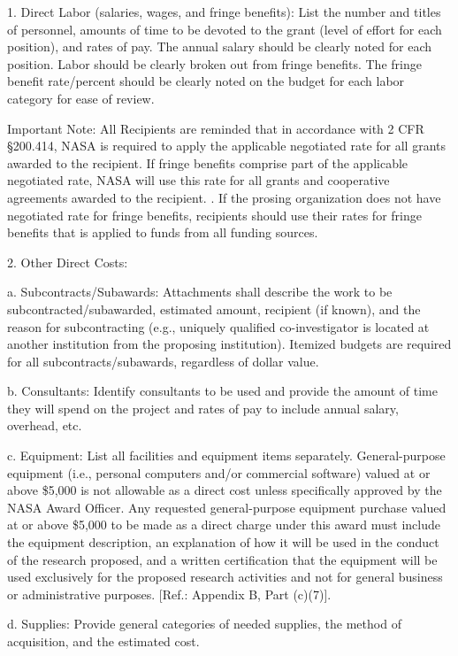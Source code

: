 \documentclass[12pt]{article}
\begin{document}
1. Direct Labor (salaries, wages, and fringe benefits): List the
   number and titles of personnel, amounts of time to be devoted to
   the grant (level of effort for each position), and rates of
   pay. The annual salary should be clearly noted for each
   position. Labor should be clearly broken out from fringe
   benefits. The fringe benefit rate/percent should be clearly noted
   on the budget for each labor category for ease of review.

Important Note: All Recipients are reminded that in accordance with 2
CFR \S 200.414, NASA is required to apply the applicable negotiated
rate for all grants awarded to the recipient. If fringe benefits
comprise part of the applicable negotiated rate, NASA will use this
rate for all grants and cooperative agreements awarded to the
recipient. . If the prosing organization does not have negotiated rate
for fringe benefits, recipients should use their rates for fringe
benefits that is applied to funds from all funding sources.



2. Other
Direct Costs:

a. Subcontracts/Subawards: Attachments shall describe the work to be
subcontracted/subawarded, estimated amount, recipient (if known), and
the reason for subcontracting (e.g., uniquely qualified
co-investigator is located at another institution from the proposing
institution). Itemized budgets are required for all
subcontracts/subawards, regardless of dollar value.

b. Consultants: Identify consultants to be used and provide the amount
of time they will spend on the project and rates of pay to include
annual salary, overhead, etc.

c. Equipment: List all facilities and equipment items
separately. General-purpose equipment (i.e., personal computers and/or
commercial software) valued at or above \$5,000 is not allowable as a
direct cost unless specifically approved by the NASA Award
Officer. Any requested general-purpose equipment purchase valued at or
above \$5,000 to be made as a direct charge under this award must
include the equipment description, an explanation of how it will be
used in the conduct of the research proposed, and a written
certification that the equipment will be used exclusively for the
proposed research activities and not for general business or
administrative purposes. [Ref.: Appendix B, Part (c)(7)].

d. Supplies: Provide general categories of needed supplies, the method
of acquisition, and the estimated cost.
\end{document}
